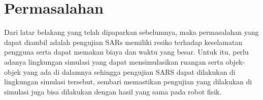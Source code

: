 \section{Permasalahan}
\label{sec:permasalahan}

Dari latar belakang yang telah dipaparkan sebelumnya,
  maka permasalahan yang dapat diambil adalah pengujian SARs memiliki resiko terhadap keselamatan pengguna serta dapat memakan biaya dan waktu yang besar.
Untuk itu, perlu adanya lingkungan simulasi yang dapat mensimulasikan ruangan serta objek-objek yang ada di dalamnya sehingga pengujian SARS dapat dilakukan di lingkungan simulasi tersebut,
  sembari memastikan pengujian yang dilakukan di simulasi juga bisa dilakukan dengan hasil yang sama pada robot fisik.
